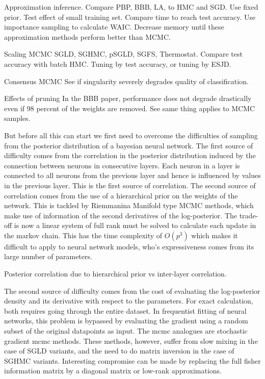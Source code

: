 \documentclass{book}
\begin{document}
\begin{enumerate}
Approximation inference. 
Compare PBP, BBB, LA, to HMC and SGD. Use fixed prior. Test effect of small training
set. Compare time to reach test accuracy. Use importance sampling to calculate
WAIC. Decrease memory until these approximation methods perform better than
MCMC.

Scaling MCMC
SGLD, SGHMC, pSGLD, SGFS, Thermostat. Compare test accuracy with batch HMC.
Tuning by test accuracy, or tuning by ESJD.

Consensus MCMC 
See if singularity severely degrades quality of classification.

Effects of pruning
In the BBB paper, performance does not degrade drastically even if 98 percent of
the weights are removed. See same thing applies to MCMC samples. 





But before all this can start we first need to overcome the difficulties of
sampling from the posterior distribution of a bayesian neural network. The
first source of difficulty comes from the correlation in the posterior distribution induced by
the connection between neurons in consecutive layers. Each neuron in a layer is
connected to all neurons from the previous layer and hence is influenced by
values in the previous layer. This is the first source of correlation. The
second source of correlation comes from the use of a hierarchical prior on the
weights of the network. This is tackled by Riemmanina Manifold type MCMC
methods, which make use of information of the second derivatives of the
log-posterior. The trade-off is now a linear system of full rank must be solved
to calculate each update in the markov chain. This has the time complexity of
$O(p^3)$ which makes it difficult to apply to neural network models, who's
expressiveness comes from its large number of parameters. 

Posterior correlation due to hierarchical prior vs inter-layer correlation. 

The second source of difficulty comes from the cost of evaluating the
log-posterior density and its derivative with respect to the parameters. For
exact calculation, both requires going through the entire dataset. In
frequentist fitting of neural networks, this problem is bypassed by evaluating
the gradient using a random subset of the original datapoints as input. The mcmc
analogues are stochastic gradient mcmc methods. These methods, however, suffer
from slow mixing in the case of SGLD variants, and the need to do matrix
inversion in the case of SGHMC variants. Interesting compromise can be made by
replacing the full fisher information matrix by a diagonal matrix or low-rank
approximations. 


\end{enumerate}
\end{document}
